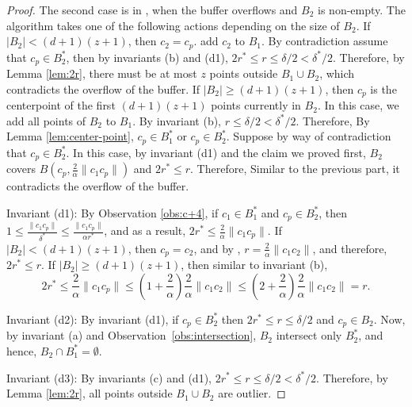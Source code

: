 \documentclass[envcountsame]{cls/cccg15}
\newcommand{\dz}{(d + 1)(z + 1)}
\newcommand{\len}[1]{\|{#1}\|}
\newcommand{\radius}[1]{\frac{2}{\alpha} \len{c_1 #1}}
\newcommand{\lee}{\leqslant}
\newcommand{\gee}{\geqslant}
\renewcommand{\leq}{\lee}
\renewcommand{\geq}{\gee}
\renewcommand{\ge}{\gee}
\begin{document}
\begin{proof}
The second case is in , when the buffer overflows and $B_2$ is non-empty.
The algorithm takes one of the following actions depending on the size of $B_2$.
If $|B_2| < \dz $, then $c_2 = c_p$.  add $c_2$ to $B_1$.
By contradiction assume that $c_p \in B_2^*$, 
then by invariants (b) and (d1), 
$2r^* \leq r \leq \delta/2 < \delta^*/2$. 
Therefore, by Lemma \ref{lem:2r}, there must be at most $z$ points outside $B_1 \cup B_2$,
which contradicts the overflow of the buffer. 
If $|B_2| \geq \dz$, then $c_p$ is the centerpoint of the first $\dz$ points currently in $B_2$. 
In this case, we add all points of $B_2$ to $B_1$. 
By invariant (b), $r \leq \delta/2 < \delta^*/2$. 
Therefore, By Lemma \ref{lem:center-point}, $c_p \in B_1^*$ or $c_p \in B_2^*$. 
Suppose by way of contradiction that $c_p \in B_2^*$. 
In this case, by invariant (d1) and the claim we proved first,
$B_2$ covers $B(c_p, \radius{c_p})$ and $2r^* \leq r$. 
Therefore, Similar to the previous part, it contradicts the overflow of the buffer. 

Invariant (d1): 
By Observation \ref{obs:c+4}, if $c_1 \in B_1^*$ and $c_p \in B_2^*$,
then $1 \leq \frac{\len{c_1 c_p}}{\delta^*} \leq \frac{\len{c_1 c_p}}{\alpha r^*}$,
and as a result, $2r^* \leq \radius{c_p}$. 
If $|B_2| < \dz$, then $c_p = c_2$, and by , 
$r = \radius{c_2}$, and therefore, $2r^* \leq r$.
If $|B_2| \ge \dz$, then similar to invariant (b), 
$$
	2r^* \leq \radius{c_p} \leq (1 + \frac{2}{\alpha})\radius{c_2} 
	\leq (2 + \frac{2}{\alpha})\radius{c_2} = r.
$$

Invariant (d2): By invariant (d1), if $c_p \in B_2^*$ then $2r^* \leq r \leq \delta /2$ and $c_p \in B_2$. 
Now, by invariant (a) and Observation~\ref{obs:intersection}, 
$B_2$ intersect only $B_2^*$, and hence, $B_2 \cap B_1^* = \emptyset$.

Invariant (d3): By invariants (c) and (d1), $2r^* \leq r \leq \delta/2 < \delta^* /2$. 
Therefore, by Lemma \ref{lem:2r}, all points outside $B_1 \cup B_2$ are outlier.

\end{proof}

\end{document}
